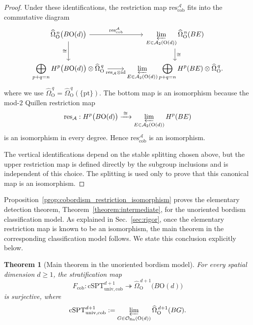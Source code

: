 \documentclass[aps,prx,reprint,superscriptaddress,twocolumn,amsmath,amssymb,amsfonts, nofootinbib]{revtex4-2}
\newcommand{\res}{\text{res}}
\theoremstyle{apsstyle}
\newtheorem{theorem}{Theorem}[section]
\begin{document}
\begin{proof}
Under these identifications, the restriction map
$\res^{\mathcal A}_{\mathrm{cob}}$ fits into the commutative diagram
\begin{equation}
\begin{tikzcd}
\widehat{\Omega}_{\mathrm O}^{\,n}
\bigl(B\mathrm O(d)\bigr)
\arrow[r,"\res^{\mathcal A}_{\mathrm{cob}}"]
\arrow[d,"\cong"']
&
\displaystyle
\varprojlim_{E\in\mathcal A_2(\mathrm O(d))}
\widehat{\Omega}_{\mathrm O}^{\,n}(BE)
\arrow[d,"\cong"]
\\
\displaystyle
\bigoplus_{p+q=n}
H^p\bigl(B\mathrm O(d)\bigr)
\otimes
\widehat{\Omega}_{\mathrm O}^{\,q}
\arrow[r,"\res_{\mathcal A}\otimes\mathrm{id}"']
&
\displaystyle
\varprojlim_{E\in\mathcal A_2(\mathrm O(d))}
\bigoplus_{p+q=n}
H^p(BE)
\otimes
\widehat{\Omega}_{\mathrm O}^{\,q}.
\end{tikzcd}
\label{eq:cobordism_restriction_diagram}
\end{equation}
where we use $\widehat{\Omega}_{\mathrm O}^{\,q}=\widehat{\Omega}_{\mathrm O}^{\,q}(\{\mathrm{pt}\})$. The bottom map is an isomorphism because the mod-$2$ Quillen restriction map
\begin{equation*}
    \res_{\mathcal A}:
    H^p\bigl(B\mathrm O(d)\bigr)
    \xrightarrow{\;\cong\;}
    \varprojlim_{E\in\mathcal A_2(\mathrm O(d))}
    H^p(BE)
\end{equation*}
is an isomorphism in every degree. Hence
$\res^{\mathcal A}_{\mathrm{cob}}$ is an isomorphism.

\noindent The vertical identifications depend on the stable splitting chosen above, but the upper restriction map is defined directly by the subgroup inclusions and is independent of this choice. The splitting is used only to prove that this canonical map is an isomorphism.
\end{proof}

\bigskip 

\noindent Proposition~\ref{prop:cobordism_restriction_isomorphism} proves the elementary detection theorem, Theorem~\ref{theorem:intermediate}, for the unoriented bordism classification model. As explained in Sec.~\ref{sec:rigor}, once the elementary restriction map is known to be an isomorphism, the main theorem in the corresponding classification model follows. We state this conclusion explicitly below.

\bigskip

\begin{theorem}[Main theorem in the unoriented bordism model]
\label{appJ:main_theorem_cobordism}
For every spatial dimension $d\geq 1$, the stratification map
\begin{equation}
    F_{\mathrm{cob}}:
    \mathrm{cSPT}_{\mathrm{univ},\mathrm{cob}}^{d+1}
    \twoheadrightarrow
    \widehat{\Omega}_{\mathrm O}^{\,d+1}
    \bigl(B\mathrm O(d)\bigr)
\end{equation}
is surjective, where
\begin{equation*}
    \mathrm{cSPT}_{\mathrm{univ},\mathrm{cob}}^{d+1}
    :=
    \varprojlim_{G\in\mathcal O_{\mathrm{fin}}(\mathrm O(d))}
    \widehat{\Omega}_{\mathrm O}^{\,d+1}(BG).
\end{equation*}
\end{theorem}
\end{document}
